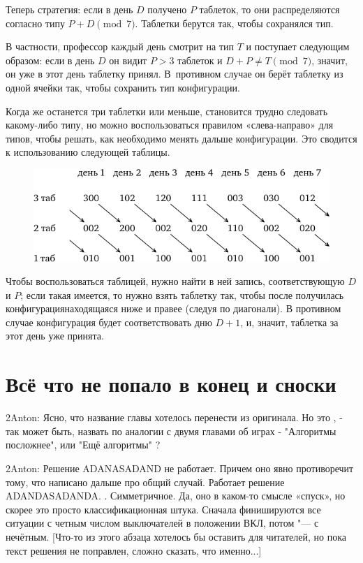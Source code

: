 \documentclass[twoside]{book}
\begin{document}
Теперь стратегия: если в день $D$ получено $P$ таблеток, то они распределяются согласно типу $P+D \pmod 7$.
Таблетки берутся так, чтобы сохранялся тип.

В частности, профессор каждый день смотрит на тип $T$ и поступает следующим образом:
если в день $D$ он видит $P>3$ таблеток и $D+P\ne T\pmod 7$, значит, он уже в этот день таблетку принял.
В~противном случае он берёт таблетку из одной ячейки так, чтобы сохранить тип конфигурации.

Когда же останется три таблетки или меньше, становится трудно следовать какому-либо типу, но можно воспользоваться правилом «слева-направо» для типов, чтобы решать, как необходимо менять дальше конфигурации.
Это сводится к использованию следующей таблицы.

\begin{figure}[!ht]
\centering
\includegraphics{mp/wink-26}
\end{figure}


Чтобы воспользоваться таблицей, нужно найти в ней запись, соответствующую $D$ и $P$;
если такая имеется, то нужно взять таблетку так, чтобы после получилась конфигурация\change{}{, }находящаяся ниже и правее (следуя по диагонали).
В противном случае конфигурация будет соответствовать дню $D+1$, и, значит, таблетка за этот день уже принята.

\section*{Всё что не попало в конец и сноски}

2Anton: Ясно, что название главы хотелось перенести из оригинала.
Но это , - так может быть, назвать по аналогии 
с двумя главами об играх - "Алгоритмы посложнее", или "Ещё алгоритмы" ?


2Anton: Решение ADANASADAND не работает. Причем оно явно противоречит тому, что написано дальше про общий случай. 
Работает решение ADANDASADANDA. . Симметричное. Да, оно в каком-то смысле «спуск», но скорее это просто 
классификационная штука. Сначала финишируются все ситуации с четным числом выключателей в положении ВКЛ, потом "--- с нечётным.
[Что-то из этого абзаца хотелось бы оставить для читателей, но пока текст решения не поправлен, сложно сказать,
что именно...]
\end{document}
